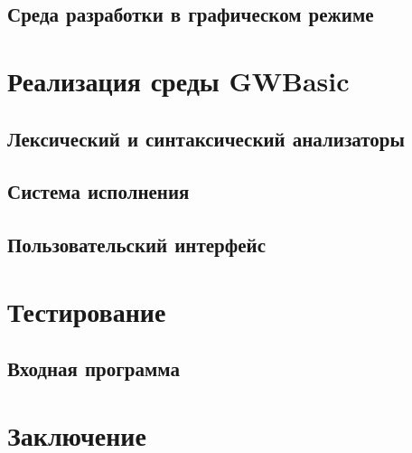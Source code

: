 \documentclass[12pt]{article}
\begin{document}
		\subsection{Среда разработки в графическом режиме}
	\newpage
	\section{Реализация среды GWBasic}
		\subsection{Лексический и синтаксический анализаторы}
		\subsection{Система исполнения}
		\subsection{Пользовательский интерфейс}
	\section{Тестирование}
		\subsection{Входная программа}
	\newpage	
	\section{Заключение}
	\newpage
	\nocite{*}
			
	
	
	\newpage
	\tableofcontents %
\end{document}
